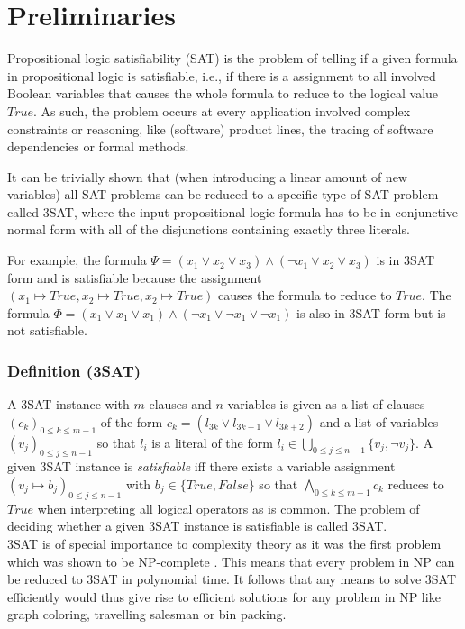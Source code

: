 \section{Preliminaries}
\label{sec:preliminaries}

Propositional logic satisfiability (SAT) is the problem of telling if a given formula in propositional logic is satisfiable, i.e., if there is a assignment to all involved Boolean variables that causes the whole formula to reduce to the logical value $\textit{True}$. As such, the problem occurs at every application involved complex constraints or reasoning, like (software) product lines, the tracing of software dependencies or formal methods.

It can be trivially shown that (when introducing a linear amount of new variables) all SAT problems can be reduced to a specific type of SAT problem called 3SAT, where the input propositional logic formula has to be in conjunctive normal form with all of the disjunctions containing exactly three literals.

For example, the formula $\Psi = ( x_{1} \vee x_{2} \vee x_{3}) \wedge ( \lnot x_{1} \vee x_{2} \vee x_{3})$ is in 3SAT form and is satisfiable because the assignment $(x_1 \mapsto \textit{True}, x_2 \mapsto \textit{True}, x_2 \mapsto \textit{True})$ causes the formula to reduce to $\textit{True}$. The formula $\Phi = ( x_{1} \vee x_{1} \vee x_{1}) \wedge ( \lnot x_{1} \vee \lnot x_{1}  \vee \lnot x_{1} )$ is also in 3SAT form but is not satisfiable.

\subsubsection{Definition (3SAT)}
A 3SAT instance with $m$ clauses and $n$ variables is given as a list of clauses $(c_k)_{0 \leq k \leq m-1}$ of the form $c_k = (l_{3k} \lor l_{3k+1} \lor l_{3k+2})$ and a list of variables $(v_j)_{0 \leq j \leq n-1}$ so that $l_i$ is a literal of the form $l_i \in \bigcup_{0 \leq j \leq n-1} \{v_j, \lnot v_j\}$. A given 3SAT instance is \emph{satisfiable} iff there exists a variable assignment $(v_j \mapsto b_j)_{0 \leq j \leq n-1}$ with $b_j \in \{\textit{True}, \textit{False}\}$ so that $\bigwedge_{0 \leq k \leq m-1} c_k$ reduces to $\textit{True}$ when interpreting all logical operators as is common. The problem of deciding whether a given 3SAT instance is satisfiable is called 3SAT.\\

3SAT is of special importance to complexity theory as it was the first problem which was shown to be NP-complete \cite{cook1971complexity}. This means that every problem in NP can be reduced to 3SAT in polynomial time. It follows that any means to solve 3SAT efficiently would thus give rise to efficient solutions for any problem in NP like graph coloring, travelling salesman or bin packing.

